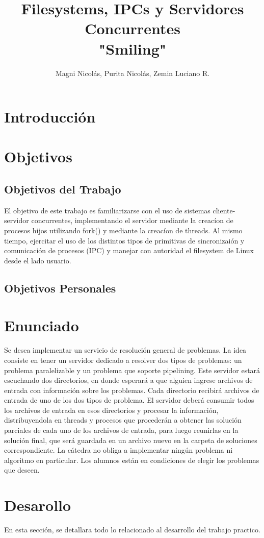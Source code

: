 \documentclass[10pt,a4paper]{report}
\author{Magni Nicol\'as, Purita Nicol\'as, Zemin Luciano R.  }
\title{Filesystems, IPCs y Servidores Concurrentes\\ "Smiling"}
\begin{document}
\maketitle
\newpage
\tableofcontents
\clearpage
\section{Introducci\'on}
\section{Objetivos}
\subsection{Objetivos del Trabajo}
El objetivo de este trabajo es familiarizarse con el uso de sistemas cliente- servidor concurrentes, implementando el servidor mediante la creac\'ion de procesos hijos utilizando fork() y mediante la creac\'ion de threads. Al mismo tiempo, ejercitar el uso de los distintos tipos de primitivas de sincronizai\'on y comunicaci\'on de procesos (IPC) y manejar con autoridad el filesystem de Linux desde el lado usuario.
\subsection{Objetivos Personales}
\section{Enunciado}
Se desea implementar un servicio de resoluci\'on general de problemas. La idea consiste en tener un servidor dedicado a resolver dos tipos de problemas: un problema paralelizable y un problema que soporte pipelining. Este servidor estar\'a escuchando dos directorios, en donde esperar\'a a que alguien ingrese archivos de entrada con informaci\'on sobre los problemas. Cada directorio recibir\'a archivos de entrada de uno de los dos tipos de problema.
El servidor deber\'a consumir todos los archivos de entrada en esos directorios y procesar la informaci\'on, distribuyendola en threads y procesos que proceder\'an a obtener las soluci\'on parciales de cada uno de los archivos de entrada, para luego reunirlas en la soluci\'on final, que ser\'a guardada en un archivo nuevo en la carpeta de soluciones correspondiente.
La c\'atedra no obliga a implementar ning\'un problema ni algoritmo en particular. Los alumnos est\'an en condiciones de elegir los problemas que deseen.
\section{Desarollo}
En esta secci\'on, se detallara todo lo relacionado al desarrollo del trabajo practico.
\end{document}
